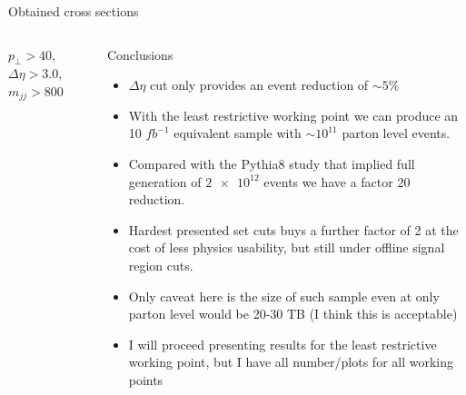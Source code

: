 \documentclass[8pt]{beamer}
\begin{document}
\begin{frame}{Obtained cross sections}
\begin{columns}
\begin{block}{$p_\perp>40$, $\Delta\eta>3.0$, $m_{jj}>800$}
\end{block}


\begin{block}{Conclusions}

\begin{itemize}
  \item $\Delta\eta$ cut only provides an event reduction of $\sim 5\%$
  \item With the least restrictive working point we can produce an 10 $fb^{-1}$ equivalent sample with $\sim 10^{11}$ parton level events.
  \item Compared with the Pythia8 study that implied full generation of $\num{2e12}$ events we have a factor 20 reduction.
  \item Hardest presented set cuts buys a further factor of 2 at the cost of less physics usability, but still under offline signal region cuts.
  \item Only caveat here is the size of such sample even at only parton level would be 20-30 TB (I think this is acceptable) 
  \item I will proceed presenting results for the least restrictive working point, but I have all number/plots for all working points
\end{itemize}

\end{block}

\end{columns}

\end{frame}
\end{document}
